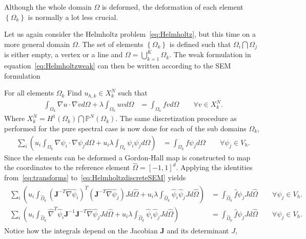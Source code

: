 Although the whole domain $\Omega$ is deformed, the deformation of each
element $\left\{ \Omega_k \right\}$ is normally a lot less crucial.

Let us again consider the Helmholtz problem~\ref{eq:Helmholtz}, but this time 
on a more general domain $\Omega$. The set of elements $\left\{ \Omega_k \right\}$
is defined such that $\Omega_i\bigcap\Omega_j$ is either empty, a vertex or a line and 
$\Omega = \bigcup^K_{k=1}\Omega_k$.
The weak formulation in equation~\ref{eq:Helmholtzweak} can then be written according 
to the SEM formulation

For all elements $\Omega_k$ Find $u_{h,k}\in X^N_k$  such that
%
\begin{align}
    \int_{\Omega_k}\nabla u \cdot \nabla v d \Omega + \lambda \int_{\Omega_k} u vd \Omega 
    &= \int_{\Omega_k}f vd \Omega \qquad \forall v \in X_k^N.
    \label{eq:HelmholtzweakSEM}
\end{align}
%
Where $X^N_k =  H^1(\Omega_k)\bigcap\mathbb{P}^N(\Omega_k)$. The same discretization 
procedure as performed for the pure spectral case is now done for each of the 
sub domains $\Omega_k$,
%
\begin{align}
    \sum_i\left(  u_i\int_{\Omega_k}\nabla \psi_i \cdot \nabla \psi_j d \Omega + 
    u_i\lambda \int_{\Omega_k} \psi_i \psi_jd \Omega \right)
    &= \int_{\Omega_k}f \psi_jd \Omega \qquad \forall \psi_j \in V_h.
    \label{eq:HelmholtzdiscreteSEM}
\end{align}
%
Since the elements can be deformed a Gordon-Hall map is 
constructed to map the coordinates to the reference element $\hat{\Omega}=[-1,1]^d$.
Applying the identities from~\ref{eq:transforms} to~\ref{eq:HelmholtzdiscreteSEM} yields
%
\begin{align}
    \begin{split}
    \sum_i\left(  u_i\int_{\hat{\Omega}_k}(\mathbf{J}^{-T}\hat{\nabla} \hat{\psi}_i)^T
    (\mathbf{J}^{-T}\hat{\nabla} \hat{\psi}_j) J d \hat{\Omega} + 
    u_i\lambda \int_{\hat{\Omega}_k} \hat{\psi}_i \hat{\psi}_j Jd \hat{\Omega} \right)
    &= \int_{\hat{\Omega}_k}\hat{f} \psi_j J d \hat{\Omega} \qquad \forall \psi_j \in V_h.  \\
    \sum_i\left(  u_i\int_{\hat{\Omega}_k}\hat{\nabla}^T \hat{\psi}_i\mathbf{J}^{-1}
    \mathbf{J}^{-T}\hat{\nabla} \hat{\psi}_j J d \hat{\Omega} + 
    u_i\lambda \int_{\hat{\Omega}_k} \hat{\psi}_i \hat{\psi}_j Jd \hat{\Omega} \right)
    &= \int_{\hat{\Omega}_k}\hat{f} \psi_j J d \hat{\Omega} \qquad \forall \psi_j \in V_h.
    \end{split}
    \label{eq:HelmholtzrefSEM}
\end{align}
%
Notice how the integrals depend on the Jacobian $\mathbf{J}$ and its determinant $J$, 


